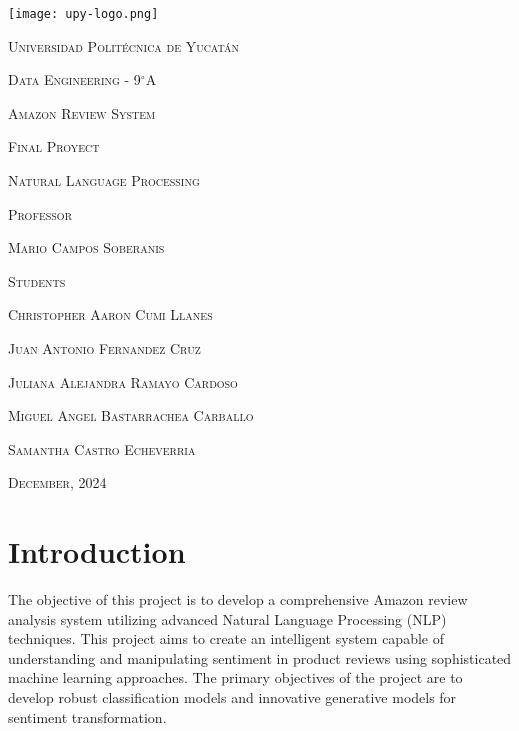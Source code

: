 \documentclass{article}
\begin{document}

\begin{titlepage}
\raggedleft
{\texttt{[image: upy-logo.png]}\par}
\centering
{\scshape\Huge Universidad Politécnica de Yucatán \par}
\vspace{1cm}
{\scshape\Large Data Engineering - 9$^{\circ}$A\par}
\vspace{2cm}
{\scshape\Huge Amazon Review System \par}
{\scshape\Large Final Proyect \par}
\vspace{2cm}
{\scshape\Large Natural Language Processing \par}
\vspace{1cm}
{\scshape\Large Professor\par} 
{\scshape\Large Mario Campos Soberanis \par}
\vspace{1cm}
{\scshape\Large Students \par}
{\scshape\Large Christopher Aaron Cumi Llanes \par}
{\scshape\Large Juan Antonio Fernandez Cruz \par}
{\scshape\Large Juliana Alejandra Ramayo Cardoso \par}
{\scshape\Large Miguel Angel Bastarrachea Carballo \par}
{\scshape\Large Samantha Castro Echeverria \par}
\vfill
{\scshape\Large December, 2024 \par}
\end{titlepage}


\section*{Introduction}

The objective of this project is to develop a comprehensive Amazon review analysis system utilizing advanced Natural Language Processing (NLP) techniques. This project aims to create an intelligent system capable of understanding and manipulating sentiment in product reviews using sophisticated machine learning approaches. The primary objectives of the project are to develop robust classification models and innovative generative models for sentiment transformation.
\end{document}
